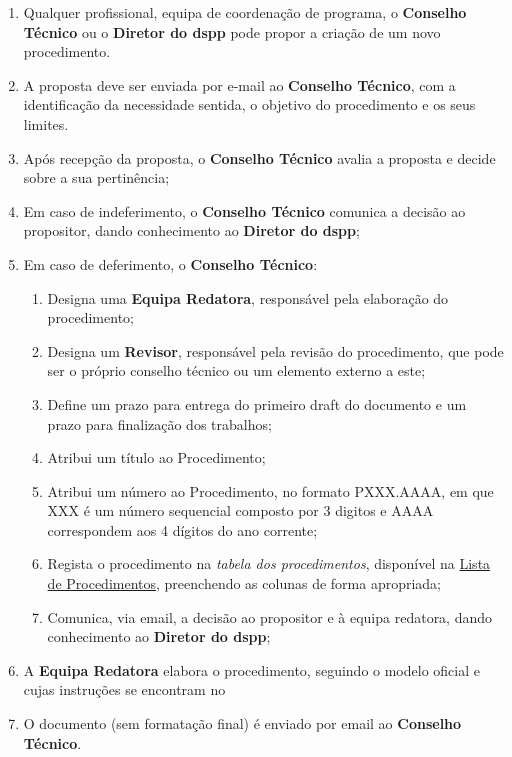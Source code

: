 \begin{enumerate}
  \item Qualquer profissional, equipa de coordenação de programa, o \textbf{Conselho Técnico} ou o \textbf{Diretor do \gls{dspp}} pode propor a criação de um novo procedimento.
  \item A proposta deve ser enviada por e-mail ao \textbf{Conselho Técnico}, com a identificação da necessidade sentida, o objetivo do procedimento e os seus limites.
  \item Após recepção da proposta, o \textbf{Conselho Técnico} avalia a proposta e decide sobre a sua pertinência;
  \item Em caso de indeferimento, o \textbf{Conselho Técnico} comunica a decisão ao propositor, dando conhecimento ao \textbf{Diretor do \gls{dspp}};
  \item Em caso de deferimento, o \textbf{Conselho Técnico}:
  \begin{enumerate}
    \item Designa uma \textbf{Equipa Redatora}, responsável pela elaboração do procedimento;
    \item Designa um \textbf{Revisor}, responsável pela revisão do procedimento, que pode ser o próprio conselho técnico ou um elemento externo a este;
    \item Define um prazo para entrega do primeiro draft do documento e um prazo para finalização dos trabalhos;
    \item Atribui um título ao Procedimento;
    \item Atribui um número ao Procedimento, no formato PXXX.AAAA, em que XXX é um número sequencial composto por 3 digitos e AAAA correspondem aos 4 dígitos do ano corrente;
    \item Regista o procedimento na \textit{tabela dos procedimentos}, disponível na \href{https://snspt-my.sharepoint.com/:l:/r/personal/93839_ulso_min-saude_pt/Lists/Lista%20de%20Procedimentos?e=zkbTNC}{Lista de Procedimentos}, preenchendo as colunas de forma apropriada;
    \item Comunica, via email, a decisão ao propositor e à equipa redatora, dando conhecimento ao \textbf{Diretor do \gls{dspp}};
  \end{enumerate}
  \item A \textbf{Equipa Redatora} elabora o procedimento, seguindo o modelo oficial e cujas instruções se encontram no 
  \item O documento (sem formatação final) é enviado por email ao \textbf{Conselho Técnico}.

\end{enumerate}
